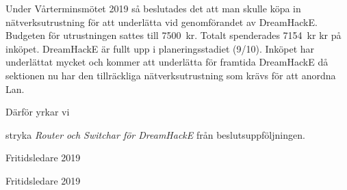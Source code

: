 \documentclass[../_main/handlingar.tex]{subfiles}
\begin{document}

    Under Vårterminsmötet 2019 så beslutades det att man skulle köpa in nätverksutrustning för att underlätta vid genomförandet av DreamHackE. Budgeten för utrustningen sattes till \SI{7500}{kr}. Totalt spenderades \SI{7154}{kr} kr på inköpet. DreamHackE är fullt upp i planeringsstadiet (9/10). Inköpet har underlättat mycket och kommer att underlätta för framtida DreamHackE då sektionen nu har den tillräckliga nätverksutrustning som krävs för att anordna Lan. 

    Därför yrkar vi
\begin{attsatser}
    \att stryka \emph{Router och Switchar för DreamHackE} från beslutsuppföljningen.
\end{attsatser}

\begin{signatures}{2}
    \signature{Vincent Palmer}{Fritidsledare 2019}
    \signature{Marcus Oknelid}{Fritidsledare 2019}
\end{signatures}
\end{document}
